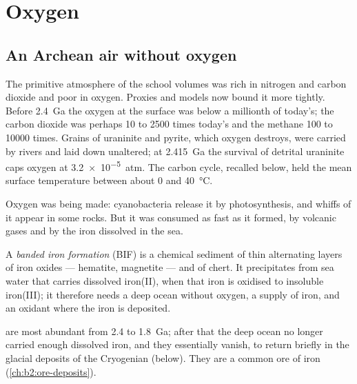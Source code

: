 \section{Oxygen}\label{sec:b2:precambrian-earth:oxygen}

\subsection*{An Archean air without oxygen}

The primitive atmosphere of the school volumes was rich in nitrogen and carbon dioxide and
poor in oxygen. Proxies and models now bound it more tightly. Before \qty{2.4}{Ga} the oxygen
at the surface was below a millionth of today's; the carbon dioxide was perhaps 10 to 2500
times today's and the methane 100 to \num{10000} times. Grains of uraninite and pyrite, which
oxygen destroys, were carried by  rivers and laid down unaltered; at \qty{2.415}{Ga}
the survival of detrital uraninite caps oxygen at \qty{3.2e-5}{atm}. The carbon cycle, recalled
below, held the mean surface temperature between about 0 and \qty{40}{\celsius}.

Oxygen was being made: cyanobacteria release it by photosynthesis, and whiffs of it appear in
some  rocks. But it was consumed as fast as it formed, by volcanic gases and by the iron
dissolved in the sea.

\begin{definition}\label{def:b2:precambrian-earth:bif}
A \emph{banded iron formation} (BIF) is a chemical sediment of
thin alternating layers of iron oxides --- hematite, magnetite --- and of chert. It precipitates
from sea water that carries dissolved iron(II), when that iron is oxidised to insoluble
iron(III); it therefore needs a deep ocean without oxygen, a supply of iron, and an oxidant
where the iron is deposited.
\end{definition}

 are most abundant from 2.4 to \qty{1.8}{Ga}; after that the deep ocean
no longer carried enough dissolved iron, and they essentially vanish, to return briefly in the
glacial deposits of the Cryogenian (below). They are a common ore of iron
(\cref{ch:b2:ore-deposits}).


